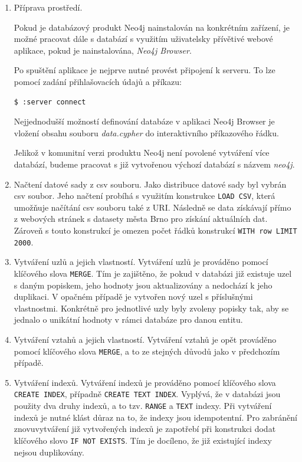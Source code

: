\documentclass[a4paper, 11pt]{article}
\begin{document}
    \begin{enumerate}        
        \item Příprava prostředí.

        Pokud je databázový produkt Neo4j nainstalován na konkrétním zařízení, je možné pracovat dále s databází s využitím uživatelsky přívětivé webové aplikace, pokud je nainstalována, \textit{Neo4j Browser}.

        Po spuštění aplikace je nejprve nutné provést připojení k serveru. To lze pomocí zadání přihlašovacích údajů a příkazu:

        \begin{lstlisting}[style=Python, language=Python, framesep=10pt]
        $ :server connect
        \end{lstlisting}

        Nejjednodušší možností definování databáze v aplikaci Neo4j Browser je vložení obsahu souboru \textit{data.cypher} do interaktivního příkazového řádku.

        Jelikož v komunitní verzi produktu Neo4j není povolené vytváření více databází, budeme pracovat s již vytvořenou výchozí databází s názvem \textit{neo4j}.
        
        \item Načtení datové sady z csv souboru.
        Jako distribuce datové sady byl vybrán csv soubor. Jeho načtení probíhá s využitím konstrukce \texttt{LOAD CSV}, která umožňuje načítání csv souboru také z URI. Následně se data získávají přímo z webových stránek s datasety města Brno pro získání aktuálních dat. Zároveň s touto konstrukcí je omezen počet řádků konstrukcí \texttt{WITH row LIMIT 2000}.
        
        \item Vytváření uzlů a jejich vlastností.
        Vytváření uzlů je prováděno pomocí klíčového slova \texttt{MERGE}. Tím je zajištěno, že pokud v databázi již existuje uzel s daným popiskem, jeho hodnoty jsou aktualizovány a nedochází k jeho duplikaci. V opačném případě je vytvořen nový uzel s příslušnými vlastnostmi. Konkrétně pro jednotlivé uzly byly zvoleny popisky tak, aby se jednalo o unikátní hodnoty v rámci databáze pro danou entitu.
        
        \item Vytváření vztahů a jejich vlastností.
        Vytváření vztahů je opět prováděno pomocí klíčového slova \texttt{MERGE}, a to ze stejných důvodů jako v předchozím případě.
        
        \item Vytváření indexů.
        Vytváření indexů je prováděno pomocí klíčového slova \texttt{CREATE INDEX}, případně \texttt{CREATE TEXT INDEX}. Vyplývá, že v databázi jsou použity dva druhy indexů, a to tzv. \texttt{RANGE} a \texttt{TEXT} indexy. Při vytváření indexů je nutné klást důraz na to, že indexy jsou idempotentní. Pro zabránění znovuvytváření již vytvořených indexů je zapotřebí při konstrukci dodat klíčového slovo \texttt{IF NOT EXISTS}. Tím je docíleno, že již existující indexy nejsou duplikovány.
    \end{enumerate}
\end{document}
